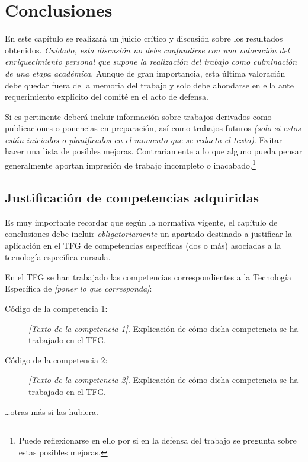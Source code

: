 \chapter{Conclusiones}
\label{cap:Conclusiones}

En este capítulo se realizará un juicio crítico y discusión sobre los resultados obtenidos. \emph{Cuidado, esta discusión no debe confundirse con una valoración del enriquecimiento personal que supone la realización del trabajo como culminación de una etapa académica}. Aunque de gran importancia, esta última valoración debe quedar fuera de la memoria del trabajo y solo debe ahondarse en ella ante requerimiento explícito del comité en el acto de defensa.

Si es pertinente deberá incluir información sobre trabajos derivados como publicaciones o ponencias en preparación, así como trabajos futuros \emph{(solo si estos están iniciados o planificados en el momento que se redacta el texto)}. Evitar hacer una lista de posibles mejoras. Contrariamente a lo que alguno pueda pensar generalmente aportan impresión de trabajo incompleto o inacabado.\footnote{Puede reflexionarse en ello por si en la defensa del trabajo se pregunta sobre estas posibles mejoras.}


\section{Justificación de competencias adquiridas}
Es muy importante recordar que según la normativa vigente, el capítulo de conclusiones debe incluir \emph{obligatoriamente} un apartado destinado a justificar la aplicación en el TFG de competencias específicas (dos o más) asociadas a la tecnología específica cursada.

En el TFG se han trabajado las competencias correspondientes a la Tecnología Específica de \emph{[poner lo que corresponda]}:

\begin{description}
\item[Código de la competencia 1:] \emph{[Texto de la competencia 1]}. Explicación de cómo dicha competencia se ha trabajado en el TFG.
\item[Código de la competencia 2:] \emph{[Texto de la competencia 2]}. Explicación de cómo dicha competencia se ha trabajado en el TFG.
\end{description}

\dots otras más si las hubiera.


